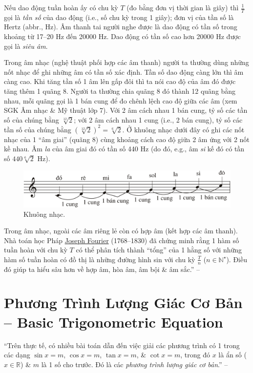 \documentclass[oneside]{book}
\numberwithin{equation}{section}
\begin{document}
Nếu dao động tuần hoàn ấy có chu kỳ $T$ (đo bằng đơn vị thời gian là giây) thì $\frac{1}{T}$ gọi là \textit{tần số} của dao động (i.e., số chu kỳ trong 1 giây); đơn vị của tần số là Hertz (abbr., Hz). Âm thanh tai người nghe được là dao động có tần số trong khoảng từ 17--20 Hz đến 20000 Hz. Dao động có tần số cao hơn 20000 Hz được gọi là \textit{siêu âm}.

Trong âm nhạc (nghệ thuật phối hợp các âm thanh) người ta thường dùng những nốt nhạc để ghi những âm có tần số xác định. Tần số dao động càng lớn thì âm càng cao. Khi tăng tần số 1 âm lên gấp đôi thì ta nói cao độ của âm đó được tăng thêm 1 quãng 8. Người ta thường chia quãng 8 đó thành 12 quãng bằng nhau, mỗi quãng gọi là 1 bán cung để đo chênh lệch cao độ giữa các âm (xem SGK Âm nhạc \& Mỹ thuật lớp 7). Với 2 âm cách nhau 1 bán cung, tỷ số các tần số của chúng bằng $\sqrt[12]{2}$; với 2 âm cách nhau 1 cung (i.e., 2 bán cung), tỷ số các tần số của chúng bằng $(\sqrt[12]{2})^2 = \sqrt[6]{2}$. Ở khuông nhạc dưới đây có ghi các nốt nhạc của 1 ``âm giai'' (quãng 8) cùng khoảng cách cao độ giữa 2 âm ứng với 2 nốt kề nhau. Âm \textit{la} của âm giai đó có tần số 440 Hz (do đó, e.g., âm \textit{si} kế đó có tần số $440\sqrt[6]{2}$ Hz).

\begin{figure}[H]
	\centering
	\includegraphics[scale=0.2]{khuong_nhac}
	\caption{Khuông nhạc.}
	\label{fig:khuong nhac}
\end{figure}
Trong âm nhạc, ngoài các âm riêng lẻ còn có hợp âm (kết hợp các âm thanh). Nhà toán học Pháp \href{https://en.wikipedia.org/wiki/Joseph_Fourier}{Joseph Fourier} (1768--1830) đã chứng minh rằng 1 hàm số tuần hoàn với chu kỳ $T$ có thể phân tích thành ``tổng'' của 1 hằng số với những hàm số tuần hoàn có đồ thị là những đường hình sin với chu kỳ $\frac{T}{n}$ ($n\in\mathbb{N}^\star$). Điều đó giúp ta hiểu sâu hơn về hợp âm, hòa âm, âm bội \& âm sắc.'' -- \cite[p. 18]{SGK_Toan_11_dai_so_giai_tich_nang_cao}


\section{Phương Trình Lượng Giác Cơ Bản -- Basic Trigonometric Equation}
``Trên thực tế, có nhiều bài toán dẫn đến việc giải các phương trình có 1 trong các dạng $\sin x = m$, $\cos x = m$, $\tan x = m$, \& $\cot x = m$, trong đó $x$ là ẩn số ($x\in\mathbb{R}$) \& $m$ là 1 số cho trước. Đó là các \textit{phương trình lượng giác cơ bản}.'' -- \cite[p. 19]{SGK_Toan_11_dai_so_giai_tich_nang_cao}
\end{document}
